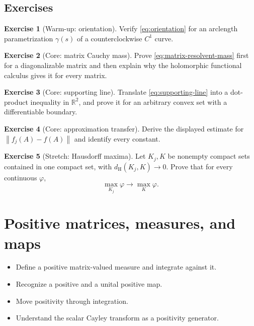 \documentclass[11pt,oneside,openany]{book}
\theoremstyle{definition}
\newtheorem{exercise}{Exercise}[chapter]
\theoremstyle{remark}
\newcommand{\R}{\mathbb R}
\newcommand{\norm}[1]{\left\lVert #1\right\rVert}
\begin{document}
\section{Exercises}

\begin{exercise}[Warm-up: orientation]
Verify \eqref{eq:orientation} for an arclength parametrization
\(\gamma(s)\) of a counterclockwise \(C^1\) curve.
\end{exercise}

\begin{exercise}[Core: matrix Cauchy mass]
\label{ex:matrix-cauchy-mass}
Prove \eqref{eq:matrix-resolvent-mass} first for a diagonalizable
matrix and then explain why the holomorphic functional calculus gives
it for every matrix.
\end{exercise}

\begin{exercise}[Core: supporting line]
Translate \eqref{eq:supporting-line} into a dot-product inequality in
\(\R^2\), and prove it for an arbitrary convex set with a differentiable
boundary.
\end{exercise}

\begin{exercise}[Core: approximation transfer]
Derive the displayed estimate for
\(\norm{f_j(A)-f(A)}\) and identify every constant.
\end{exercise}

\begin{exercise}[Stretch: Hausdorff maxima]
Let \(K_j,K\) be nonempty compact sets contained in one compact set,
with \(d_{\mathrm H}(K_j,K)\to0\).  Prove that for every continuous
\(\varphi\),
\[
  \max_{K_j}\varphi\longrightarrow\max_K\varphi.
\]
\end{exercise}

\chapter{Positive matrices, measures, and maps}
\label{ch:positive-maps}

\begin{learninggoals}
\begin{itemize}
  \item Define a positive matrix-valued measure and integrate against it.
  \item Recognize a positive and a unital positive map.
  \item Move positivity through integration.
  \item Understand the scalar Cayley transform as a positivity
  generator.
\end{itemize}
\end{learninggoals}
\end{document}
